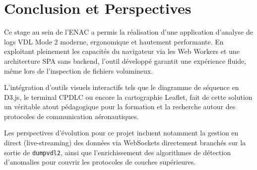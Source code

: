 \documentclass[a4paper,11pt]{report}
\begin{document}
\chapter*{Conclusion et Perspectives}

Ce stage au sein de l'ENAC a permis la réalisation d'une application d'analyse de logs VDL Mode 2 moderne, ergonomique et hautement performante. En exploitant pleinement les capacités du navigateur via les Web Workers et une architecture SPA sans backend, l'outil développé garantit une expérience fluide, même lors de l'inspection de fichiers volumineux.

L'intégration d'outils visuels interactifs tels que le diagramme de séquence en D3.js, le terminal CPDLC ou encore la cartographie Leaflet, fait de cette solution un véritable atout pédagogique pour la formation et la recherche autour des protocoles de communication aéronautiques.

Les perspectives d'évolution pour ce projet incluent notamment la gestion en direct (live-streaming) des données via WebSockets directement branchés sur la sortie de \texttt{dumpvdl2}, ainsi que l'enrichissement des algorithmes de détection d'anomalies pour couvrir les protocoles de couches supérieures.
\end{document}
